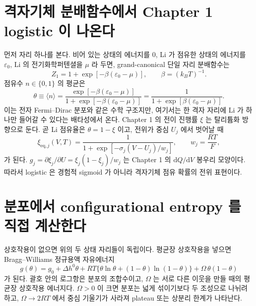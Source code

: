 \documentclass[11pt,a4paper]{article}
\newcommand{\dd}{\mathrm{d}}
\newcommand{\eq}{\mathrm{eq}}
\begin{document}
\section{격자기체 분배함수에서 Chapter 1 logistic 이 나온다}\label{sec:partition}
먼저 자리 하나를 본다. 비어 있는 상태의 에너지를 0, Li 가 점유한 상태의 에너지를 $\varepsilon_0$,
Li 의 전기화학퍼텐셜을 $\mu$ 라 두면, grand-canonical 단일 자리 분배함수는
\begin{equation}
Z_1=1+\exp[-\beta(\varepsilon_0-\mu)],\qquad \beta=(k_B T)^{-1}.
\label{eq:z1}
\end{equation}
점유수 $n\in\{0,1\}$ 의 평균은
\begin{equation}
\theta\equiv\langle n\rangle
=\frac{\exp[-\beta(\varepsilon_0-\mu)]}{1+\exp[-\beta(\varepsilon_0-\mu)]}
=\frac{1}{1+\exp[\beta(\varepsilon_0-\mu)]}.
\label{eq:fdsite}
\end{equation}
이는 전자 Fermi--Dirac 분포와 같은 수학 구조지만, 여기서는 한 격자 자리에 Li 가 하나만 들어갈 수 있다는
배타성에서 온다. Chapter 1 의 전이 진행률 $\xi$ 는 탈리튬화 방향으로 둔다. 곧 Li 점유율은
$\theta=1-\xi$ 이고, 전위가 중심 $U_j$ 에서 벗어날 때
\begin{equation}
\xi_{\eq,j}(V,T)=\frac{1}{1+\exp[-\sigma_j(V-U_j)/w_j]},\qquad
w_j=\frac{RT}{F},
\label{eq:ch1logistic}
\end{equation}
가 된다. $g_j=\partial\xi_j/\partial U=\xi_j(1-\xi_j)/w_j$ 는 Chapter 1 의 $\dd Q/\dd V$ 봉우리 모양이다.
따라서 logistic 은 경험적 sigmoid 가 아니라 격자기체 점유 확률의 전위 표현이다.

\section{분포에서 configurational entropy 를 직접 계산한다}\label{sec:config}
상호작용이 없으면 위의 두 상태 자리들이 독립이다. 평균장 상호작용을 넣으면 Bragg--Williams
정규용액 자유에너지 \cite{huggins1942,bazant2013}
\begin{equation}
g(\theta)=g_0+\Delta h^0\theta
  +RT\{\theta\ln\theta+(1-\theta)\ln(1-\theta)\}
  +\Omega\,\theta(1-\theta)
\label{eq:bw}
\end{equation}
가 된다. 괄호 안의 로그항은 분포의 조합수이고, $\Omega$ 는 서로 다른 이웃을 만들 때의 평균장 상호작용
에너지다. $\Omega>0$ 이 크면 분포는 넓게 섞이기보다 두 조성으로 나뉘려 하고, $\Omega\to2RT$ 에서
중심 기울기가 사라져 plateau 또는 상분리 한계가 나타난다.
\end{document}
